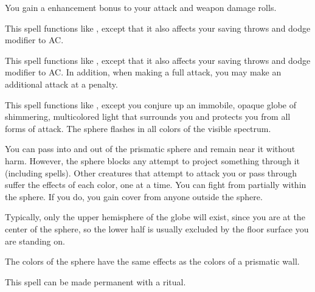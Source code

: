 \begin{spelleffect}
  You gain a  enhancement bonus to your attack and weapon damage rolls. \bonusscalingdescription
\end{spelleffect}

\begin{spelleffect}
  This spell functions like , except that it also affects your saving throws and dodge modifier to AC.
\end{spelleffect}

\begin{spelleffect}
  This spell functions like , except that it also affects your saving throws and dodge modifier to AC. In addition, when making a full attack, you may make an additional attack at a  penalty.
\end{spelleffect}

\begin{spelleffect}
  This spell functions like , except you conjure up an immobile, opaque globe of shimmering, multicolored light that surrounds you and protects you from all forms of attack. The sphere flashes in all colors of the visible spectrum. 
  \par You can pass into and out of the prismatic sphere and remain near it without harm. However, the sphere blocks any attempt to project something through it (including spells). Other creatures that attempt to attack you or pass through suffer the effects of each color, one at a time. You can fight from partially within the sphere. If you do, you gain cover from anyone outside the sphere.
  \par Typically, only the upper hemisphere of the globe will exist, since you are at the center of the sphere, so the lower half is usually excluded by the floor surface you are standing on.
  \par The colors of the sphere have the same effects as the colors of a prismatic wall.
\end{spelleffect}
\begin{spellnotes}
This spell can be made permanent with a  ritual.
\end{spellnotes}

